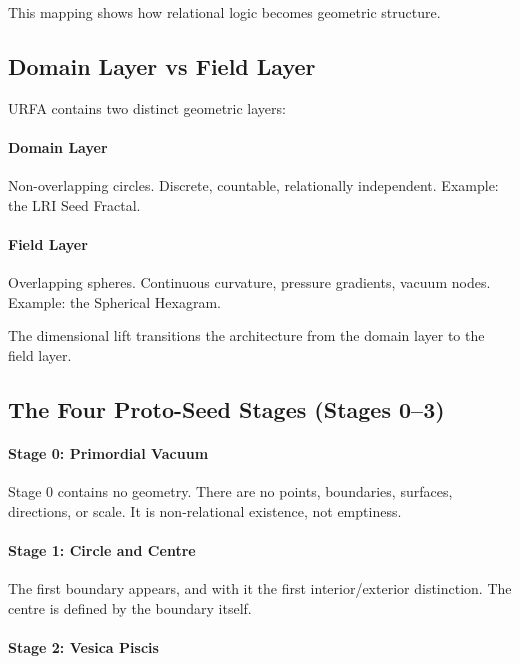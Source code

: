 This mapping shows how relational logic becomes geometric structure.

\subsection{Domain Layer vs Field Layer}

URFA contains two distinct geometric layers:

\paragraph{Domain Layer}  
Non-overlapping circles.  
Discrete, countable, relationally independent.  
Example: the LRI Seed Fractal.

\paragraph{Field Layer}  
Overlapping spheres.  
Continuous curvature, pressure gradients, vacuum nodes.  
Example: the Spherical Hexagram.

The dimensional lift transitions the architecture from the domain layer to the field layer.

\subsection{The Four Proto-Seed Stages (Stages 0–3)}

\paragraph{Stage 0: Primordial Vacuum}

Stage 0 contains no geometry.  
There are no points, boundaries, surfaces, directions, or scale.  
It is non-relational existence, not emptiness.

\paragraph{Stage 1: Circle and Centre}

The first boundary appears, and with it the first interior/exterior distinction.  
The centre is defined by the boundary itself.

\paragraph{Stage 2: Vesica Piscis}

